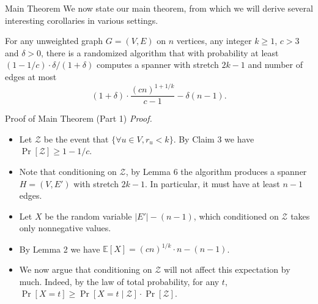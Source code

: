 \documentclass{beamer}
\begin{document}
\begin{frame}{Main Theorem}
    We now state our main theorem, from which we will derive several interesting corollaries in various settings.
    
    \vspace{0.4cm}
    \begin{theorem}[Theorem 1]
        For any unweighted graph $G = (V,E)$ on $n$ vertices, any integer $k \ge 1$, $c > 3$ and $\delta > 0$, there is a randomized algorithm that with probability at least $(1 - 1/c) \cdot \delta / (1+\delta)$ computes a spanner with stretch $2k - 1$ and number of edges at most
        \[ (1+\delta) \cdot \frac{(cn)^{1+1/k}}{c-1} - \delta(n-1) .\]
    \end{theorem}
\end{frame}

\begin{frame}{Proof of Main Theorem (Part 1)}
    \small
    \textit{Proof.}
    \begin{itemize}
        \item Let $\mathcal{Z}$ be the event that $\{\forall u \in V, r_u < k\}$. By Claim 3 we have $\Pr[\mathcal{Z}] \ge 1 - 1/c$.
        \item Note that conditioning on $\mathcal{Z}$, by Lemma 6 the algorithm produces a spanner $H = (V,E')$ with stretch $2k - 1$. In particular, it must have at least $n - 1$ edges.
        \item Let $X$ be the random variable $|E'| - (n - 1)$, which conditioned on $\mathcal{Z}$ takes only nonnegative values.
        \item By Lemma 2 we have $\mathbb{E}[X] = (cn)^{1/k} \cdot n - (n - 1)$.
        \item We now argue that conditioning on $\mathcal{Z}$ will not affect this expectation by much. Indeed, by the law of total probability, for any $t$, $\Pr[X = t] \ge \Pr[X = t \mid \mathcal{Z}] \cdot \Pr[\mathcal{Z}]$.
    \end{itemize}
\end{frame}
\end{document}
